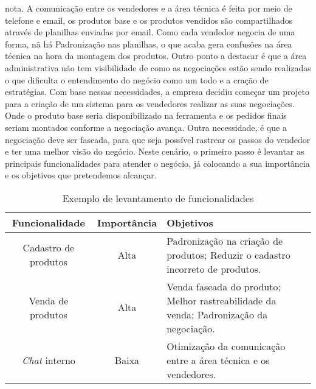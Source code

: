       nota. A comunicação entre os vendedores e a área técnica é feita por meio de
      telefone e email, os produtos base e os produtos vendidos são compartilhados
      através de planilhas enviadas por email. Como cada vendedor negocia de uma
      forma, nã há Padronização nas planilhas, o que acaba gera confusões na área
      técnica na hora da montagem dos produtos. Outro ponto a destacar é que a área
      administrativa não tem visibilidade de como as negociações estão sendo realizadas
      o que dificulta o entendimento do negócio como um todo e a cração de
      estratégias. \newline
      Com base nessas necessidades, a empresa decidiu começar um projeto para a
      criação de um sistema para os vendedores realizar as suas negociações.
      Onde o produto base seria disponibilizado na ferramenta e os pedidos finais
      seriam montados conforme a negociação avança. Outra necessidade, é que a
      negociação deve ser faseada, para que seja possível rastrear os passos do
      vendedor e ter uma melhor visão do negócio. \newline
      Neste cenário, o primeiro passo é levantar as principais funcionalidades para
      atender o negócio, já colocando a sua importância e os objetivos que pretendemos
      alcançar.

      \begin{table}[h!]
        \centering
        \begin{tabular}{|c|c|p{8cm}|}
          \hline
          \textbf{Funcionalidade} &
          \textbf{Importância}  &
          \textbf{Objetivos} \\ \hline
          Cadastro de produtos &
          Alta &
          Padronização na criação de produtos; \newline
          Reduzir o cadastro incorreto de produtos.
          \\ \hline
          Venda de produtos &
          Alta &
          Venda faseada do produto; \newline
          Melhor rastreabilidade da venda; \newline
          Padronização da negociação.
          \\ \hline
          \textit{Chat} interno &
          Baixa &
          Otimização da comunicação entre a área técnica e os vendedores.
          \\ \hline
        \end{tabular}
        \caption{Exemplo de levantamento de funcionalidades}
        \label{Tabela:2}
      \end{table}

